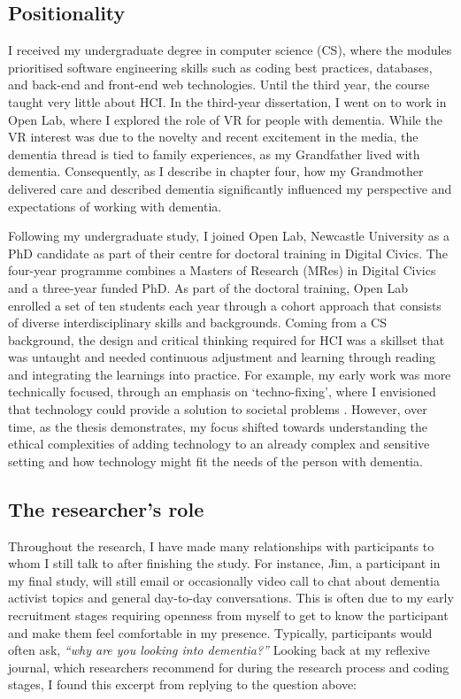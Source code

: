 \subsection{Positionality}
\label{Method:Positionality}
I received my undergraduate degree in computer science (CS), where the modules prioritised software engineering skills such as coding best practices, databases, and back-end and front-end web technologies. Until the third year, the course taught very little about HCI. In the third-year dissertation, I went on to work in Open Lab, where I explored the role of VR for people with dementia. While the VR interest was due to the novelty and recent excitement in the media, the dementia thread is tied to family experiences, as my Grandfather lived with dementia. Consequently, as I describe in chapter four, how my Grandmother delivered care and described dementia significantly influenced my perspective and expectations of working with dementia. 

Following my undergraduate study, I joined Open Lab, Newcastle University as a PhD candidate as part of their centre for doctoral training in Digital Civics. The four-year programme combines a Masters of Research (MRes) in Digital Civics and a three-year funded PhD. As part of the doctoral training, Open Lab enrolled a set of ten students each year through a cohort approach that consists of diverse interdisciplinary skills and backgrounds. Coming from a CS background, the design and critical thinking required for HCI was a skillset that was untaught and needed continuous adjustment and learning through reading and integrating the learnings into practice. For example, my early work was more technically focused, through an emphasis on `techno-fixing', where I envisioned that technology could provide a solution to societal problems \citep{jongsma2017usual}. However, over time, as the thesis demonstrates, my focus shifted towards understanding the ethical complexities of adding technology to an already complex and sensitive setting and how technology might fit the needs of the person with dementia.

\subsection{The researcher's role}
\label{Reflexivity:Questions}
Throughout the research, I have made many relationships with participants to whom I still talk to after finishing the study. For instance, Jim, a participant in my final study, will still email or occasionally video call to chat about dementia activist topics and general day-to-day conversations. This is often due to my early recruitment stages requiring openness from myself to get to know the participant and make them feel comfortable in my presence. Typically, participants would often ask, \textit{``why are you looking into dementia?''} Looking back at my reflexive journal, which researchers recommend for during the research process and coding stages, I found this excerpt from  replying to the question above:

